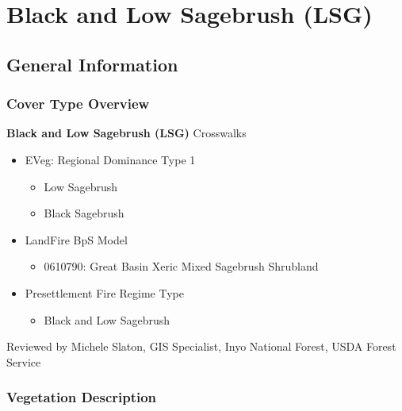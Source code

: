 \newpage
\section{Black and Low Sagebrush (LSG)}
\label{lsg-description}

\subsection*{General Information}

\subsubsection{Cover Type Overview}

\textbf{Black and Low Sagebrush (LSG)}
\newline
Crosswalks
\begin{itemize}
	\item EVeg: Regional Dominance Type 1
	\begin{itemize}
		\item Low Sagebrush
		\item Black Sagebrush
	\end{itemize}

	\item LandFire BpS Model
	\begin{itemize}
		\item 0610790: Great Basin Xeric Mixed Sagebrush Shrubland
	\end{itemize}

	\item Presettlement Fire Regime Type
	\begin{itemize}
		\item Black and Low Sagebrush
	\end{itemize}
\end{itemize}

\noindent Reviewed by Michele Slaton, GIS Specialist, Inyo National Forest, USDA Forest Service

\subsubsection{Vegetation Description}
